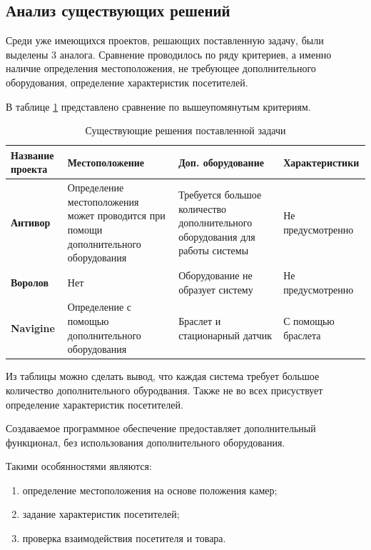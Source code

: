 \subsection{Анализ существующих решений}

Среди уже имеющихся проектов, решающих поставленную задачу, были выделены 3 аналога.
Сравнение проводилось по ряду критериев, а именно наличие определения местоположения, 
не требующее дополнительного оборудования, определение характеристик посетителей.

В таблице \ref{decisions} представлено сравнение по вышеупомянутым критериям.

\begin{table}[ht!]
	\centering
	\caption{Существующие решения поставленной задачи}
	\label{decisions}
	\begin{tabular}{|p{2.6cm}|p{5cm}|p{4cm}|p{4cm}|}
			\hline
			\textbf{Название проекта} & \textbf{Местоположение} & \textbf{Доп. оборудование} & \textbf{Характеристики}\\
			\hline
			\textbf{Антивор \cite{Antivor}} & Определение местоположения может проводится при помощи дополнительного оборудования 
			& Требуется большое количество дополнительного оборудования для работы системы
			 & Не предусмотренно\\
			\hline

			\textbf{Воролов \cite{VOROLOV}} & Нет 
			& Оборудование не образует систему
			 & Не предусмотренно\\
			\hline

			\textbf{Navigine \cite{Navigine}} & Определение с помощью дополнительного оборудования 
			& Браслет и стационарный датчик
			 & С помощью браслета\\
			\hline
	\end{tabular}
\end{table}


Из таблицы можно сделать вывод, что каждая система требует большое количество дополнительного обуродвания.
Также не во всех присуствует определение характеристик посетителей.

Создаваемое программное обеспечение предоставляет дополнительный функционал, без использования дополнительного оборудования.

Такими особянностями являются:

\begin{enumerate}[label=\arabic*.]
	\item определение местоположения на основе положения камер;
	\item задание характеристик посетителей;
	\item проверка взаимодействия посетителя и товара.
\end{enumerate}

